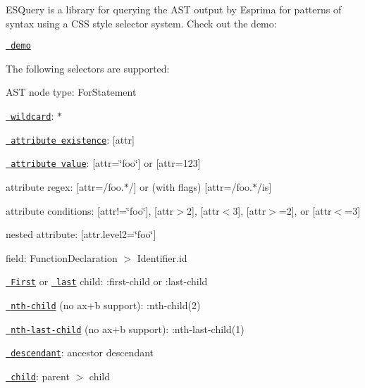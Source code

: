 E\+S\+Query is a library for querying the A\+ST output by Esprima for patterns of syntax using a C\+SS style selector system. Check out the demo\+:

\href{https://estools.github.io/esquery/}{\texttt{ demo}}

The following selectors are supported\+:
\begin{DoxyItemize}
\item A\+ST node type\+: {\ttfamily For\+Statement}
\item \href{http://dev.w3.org/csswg/selectors4/\#universal-selector}{\texttt{ wildcard}}\+: {\ttfamily $\ast$}
\item \href{http://dev.w3.org/csswg/selectors4/\#attribute-selectors}{\texttt{ attribute existence}}\+: {\ttfamily \mbox{[}attr\mbox{]}}
\item \href{http://dev.w3.org/csswg/selectors4/\#attribute-selectors}{\texttt{ attribute value}}\+: {\ttfamily \mbox{[}attr=\char`\"{}foo\char`\"{}\mbox{]}} or {\ttfamily \mbox{[}attr=123\mbox{]}}
\item attribute regex\+: {\ttfamily \mbox{[}attr=/foo.$\ast$/\mbox{]}} or (with flags) {\ttfamily \mbox{[}attr=/foo.$\ast$/is\mbox{]}}
\item attribute conditions\+: {\ttfamily \mbox{[}attr!=\char`\"{}foo\char`\"{}\mbox{]}}, {\ttfamily \mbox{[}attr$>$2\mbox{]}}, {\ttfamily \mbox{[}attr$<$3\mbox{]}}, {\ttfamily \mbox{[}attr$>$=2\mbox{]}}, or {\ttfamily \mbox{[}attr$<$=3\mbox{]}}
\item nested attribute\+: {\ttfamily \mbox{[}attr.\+level2=\char`\"{}foo\char`\"{}\mbox{]}}
\item field\+: {\ttfamily Function\+Declaration $>$ Identifier.\+id}
\item \href{http://dev.w3.org/csswg/selectors4/\#the-first-child-pseudo}{\texttt{ First}} or \href{http://dev.w3.org/csswg/selectors4/\#the-last-child-pseudo}{\texttt{ last}} child\+: {\ttfamily \+:first-\/child} or {\ttfamily \+:last-\/child}
\item \href{http://dev.w3.org/csswg/selectors4/\#the-nth-child-pseudo}{\texttt{ nth-\/child}} (no ax+b support)\+: {\ttfamily \+:nth-\/child(2)}
\item \href{http://dev.w3.org/csswg/selectors4/\#the-nth-last-child-pseudo}{\texttt{ nth-\/last-\/child}} (no ax+b support)\+: {\ttfamily \+:nth-\/last-\/child(1)}
\item \href{http://dev.w3.org/csswg/selectors4/\#descendant-combinators}{\texttt{ descendant}}\+: {\ttfamily ancestor descendant}
\item \href{http://dev.w3.org/csswg/selectors4/\#child-combinators}{\texttt{ child}}\+: {\ttfamily parent $>$ child}

\end{DoxyItemize}
